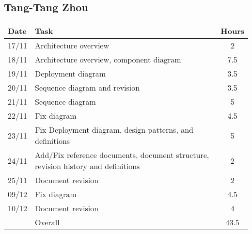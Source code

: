 \subsection{Tang-Tang Zhou}

\begin{table}[H]
\begin{tabularx}{\textwidth}{|l|X|c|}
\hline
\rowcolor[HTML]{C0C0C0} 
Date & Task & Hours\\ \hline
17/11 & Architecture overview & 2\\ \hline
18/11 & Architecture overview, component diagram & 7.5 \\ \hline
19/11 & Deployment diagram & 3.5\\ \hline
20/11 & Sequence diagram and revision & 3.5\\ \hline
21/11 & Sequence diagram & 5 \\ \hline
22/11 & Fix diagram & 4.5 \\ \hline
23/11 & Fix Deployment diagram, design patterns, and definitions  & 5 \\ \hline
24/11 & Add/Fix reference documents, document structure, revision history and definitions & 2 \\ \hline
25/11 & Document revision & 2 \\ \hline
09/12 & Fix diagram & 4.5 \\ \hline
10/12 & Document revision & 4 \\ \hline
\rowcolor[HTML]{C0C0C0} 
& Overall & 43.5 \\ \hline
\end{tabularx}
\end{table}